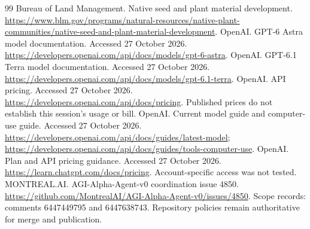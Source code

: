 \documentclass[11pt]{article}
\begin{document}
\begin{thebibliography}{99}
 Bureau of Land Management. Native seed and plant material development. \url{https://www.blm.gov/programs/natural-resources/native-plant-communities/native-seed-and-plant-material-development}.
 OpenAI. GPT-6 Astra model documentation. Accessed 27 October 2026. \url{https://developers.openai.com/api/docs/models/gpt-6-astra}.
 OpenAI. GPT-6.1 Terra model documentation. Accessed 27 October 2026. \url{https://developers.openai.com/api/docs/models/gpt-6.1-terra}.
 OpenAI. API pricing. Accessed 27 October 2026. \url{https://developers.openai.com/api/docs/pricing}. Published prices do not establish this session's usage or bill.
 OpenAI. Current model guide and computer-use guide. Accessed 27 October 2026. \url{https://developers.openai.com/api/docs/guides/latest-model}; \url{https://developers.openai.com/api/docs/guides/tools-computer-use}.
 OpenAI. Plan and API pricing guidance. Accessed 27 October 2026. \url{https://learn.chatgpt.com/docs/pricing}. Account-specific access was not tested.
 MONTREAL.AI. AGI-Alpha-Agent-v0 coordination issue 4850. \url{https://github.com/MontrealAI/AGI-Alpha-Agent-v0/issues/4850}. Scope records: comments 6447449795 and 6447638743. Repository policies remain authoritative for merge and publication.
\end{thebibliography}
\end{document}
